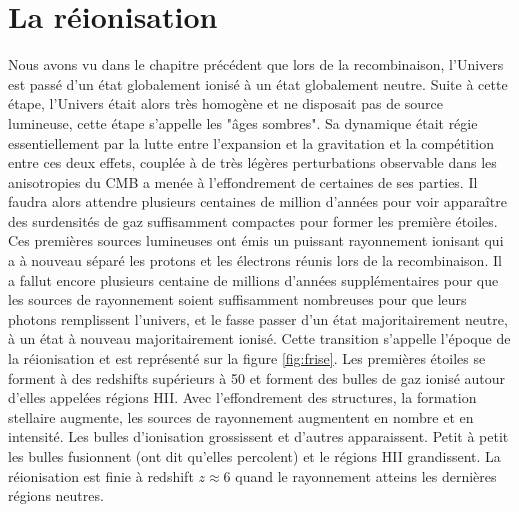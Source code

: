 
\chapter{La réionisation} 
\label{sec:introreio}

%
%
%
%



Nous avons vu dans le chapitre précédent que lors de la recombinaison, l'Univers est passé d'un état globalement ionisé à un état globalement neutre.
Suite à cette étape, l'Univers était alors très homogène et ne disposait pas de source lumineuse, cette étape s'appelle les "âges sombres".
Sa dynamique était régie essentiellement par la lutte entre l'expansion et la gravitation et la compétition entre ces deux effets, couplée à de très légères perturbations observable dans les anisotropies du \ac{CMB} a menée à l'effondrement de certaines de ses parties.
Il faudra alors attendre plusieurs centaines de million d'années pour voir apparaître des surdensités de gaz suffisamment compactes pour former les première étoiles.
Ces premières sources lumineuses ont émis un puissant rayonnement ionisant qui a à nouveau séparé les protons et les électrons réunis lors de la recombinaison.
Il a fallut encore plusieurs centaine de millions d'années supplémentaires pour que les sources de rayonnement soient suffisamment nombreuses pour que leurs photons remplissent l'univers, et le fasse passer d'un état majoritairement neutre, à un état à nouveau majoritairement ionisé.
Cette transition s'appelle l’époque de la réionisation et est représenté sur la figure \ref{fig:frise}.
Les premières étoiles se forment à des redshifts supérieurs à 50 et forment des bulles de gaz ionisé autour d'elles appelées régions HII.
Avec l’effondrement des structures, la formation stellaire augmente, les sources de rayonnement augmentent en nombre et en intensité.
Les bulles d'ionisation grossissent et d'autres apparaissent.
Petit à petit les bulles fusionnent (ont dit qu'elles percolent) et le régions HII grandissent.
La réionisation est finie à redshift $z\approx 6$ quand le rayonnement atteins les dernières régions neutres.

